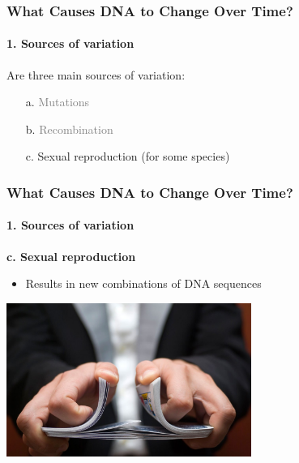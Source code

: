 \documentclass[10pt]{beamer}
\begin{document}
\begin{frame}[t]
\frametitle{What Causes DNA to Change Over Time?}
\framesubtitle{1. Sources of variation}
\vspace{0.5cm}

	Are three main sources of variation:
	\medskip
		\begin{enumerate}
			\item[a.] \textcolor{gray}{Mutations}
			\medskip
			\item[b.] \textcolor{gray}{Recombination}
			\medskip
			\item[c.] Sexual reproduction (for some species)
		\end{enumerate}
\end{frame}


\begin{frame}[t]
\frametitle{What Causes DNA to Change Over Time?}
\framesubtitle{1. Sources of variation}
\vspace{0.5cm}

	\textbf{\textcolor{myblue}{c.} Sexual reproduction}\\
		\medskip
		\begin{itemize}
			\item Results in new combinations of DNA sequences	
		\end{itemize}
		
		\vspace{0.5cm}
		
		\begin{center}
			\includegraphics[width=0.6\textwidth]{figures/cards.jpg}
		\end{center}
\end{frame}
\end{document}
